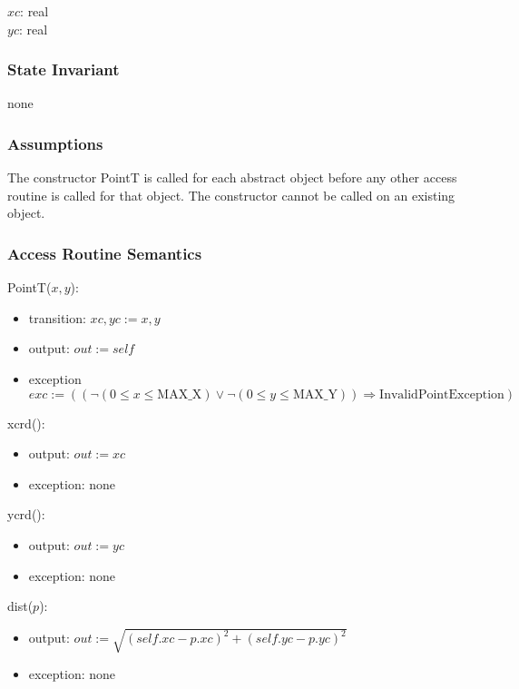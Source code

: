 \documentclass[12pt]{article}
\begin{document}
$xc$: real\\
$yc$: real

\subsubsection* {State Invariant}

none

\subsubsection* {Assumptions}
The constructor PointT is called for each abstract object before any other access routine is called for that
object.  The constructor cannot be called on an existing object.

\subsubsection* {Access Routine Semantics}

PointT($x, y$):
\begin{itemize}
\item transition: $xc, yc := x, y$
\item output: $out := \mathit{self}$
\item exception
 $exc := ((\neg(0 \leq x \leq \mbox{MAX\_X}) \vee \neg(0 \leq y \leq \mbox{MAX\_Y})) \Rightarrow
\mbox{InvalidPointException})$
\end{itemize}

\noindent xcrd():
\begin{itemize}
\item output: $out := xc$
\item exception: none
\end{itemize}

\noindent ycrd():
\begin{itemize}
\item output: $out := yc$
\item exception: none
\end{itemize}

\noindent dist($p$):
\begin{itemize}
\item output: $out := \sqrt{(\mathit{self}.xc - p.xc)^2 + (\mathit{self}.yc - p.yc)^2}$
\item exception: none
\end{itemize}

\newpage
\end{document}
